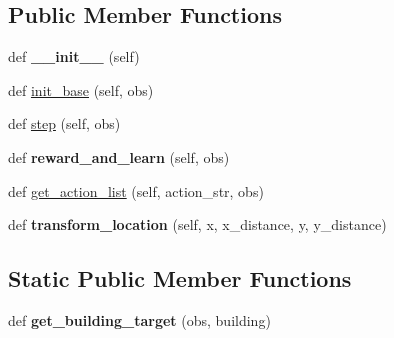 \subsection*{Public Member Functions}
\begin{DoxyCompactItemize}
\item 
def {\bfseries \+\_\+\+\_\+init\+\_\+\+\_\+} (self)\hypertarget{classBotty__McBotface_1_1Botty_a2b20c5c22329f5a75ef3c343e630a4c1}{}\label{classBotty__McBotface_1_1Botty_a2b20c5c22329f5a75ef3c343e630a4c1}

\item 
def \hyperlink{classBotty__McBotface_1_1Botty_a979fe38b2208653ab5195c7115e978c4}{init\+\_\+base} (self, obs)
\item 
def \hyperlink{classBotty__McBotface_1_1Botty_a6ad2ce98b25c627204c31f37d26d40dc}{step} (self, obs)
\item 
def {\bfseries reward\+\_\+and\+\_\+learn} (self, obs)\hypertarget{classBotty__McBotface_1_1Botty_aaf8459960013f8b5e21e0928d7031026}{}\label{classBotty__McBotface_1_1Botty_aaf8459960013f8b5e21e0928d7031026}

\item 
def \hyperlink{classBotty__McBotface_1_1Botty_a230761c2312622094689a0950b1851a9}{get\+\_\+action\+\_\+list} (self, action\+\_\+str, obs)
\item 
def {\bfseries transform\+\_\+location} (self, x, x\+\_\+distance, y, y\+\_\+distance)\hypertarget{classBotty__McBotface_1_1Botty_a0d6257b0994cb62993fd6346f77d97dc}{}\label{classBotty__McBotface_1_1Botty_a0d6257b0994cb62993fd6346f77d97dc}

\end{DoxyCompactItemize}
\subsection*{Static Public Member Functions}
\begin{DoxyCompactItemize}
\item 
def {\bfseries get\+\_\+building\+\_\+target} (obs, building)\hypertarget{classBotty__McBotface_1_1Botty_a729cd86d54aa83a7f01a458d03fde940}{}\label{classBotty__McBotface_1_1Botty_a729cd86d54aa83a7f01a458d03fde940}

\end{DoxyCompactItemize}
